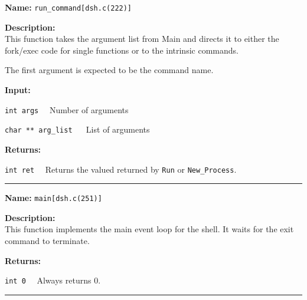 \documentclass[11pt,a4paper]{article}
\begin{document}
\begin{description}
\item \textbf{Name:} 
\verb|run_command[dsh.c(222)]|

\item \textbf{Description:}\\
This function takes the argument list from Main and directs it to either the
fork/exec code for single functions or to the intrinsic commands.

The first argument is expected to be the command name. 

\item \textbf{Input:}
\begin{description}
\item \verb|int args|~~ Number of arguments
\item \verb|char ** arg_list| ~~ List of arguments
\end{description}

\item \textbf{Returns:}
\begin{description}
\item \verb|int ret|~~ Returns the valued returned by \verb|Run| or \verb|New_Process|.
\end{description}
\end{description}\hrule

\begin{description}
\item \textbf{Name:} 
\verb|main[dsh.c(251)]|

\item \textbf{Description:}\\
This function implements the main event loop for the shell. It waits for the exit command to terminate.

\item \textbf{Returns:}
\begin{description}
\item \verb|int 0|~~ Always returns 0.
\end{description}
\end{description}\hrule
\end{document}
